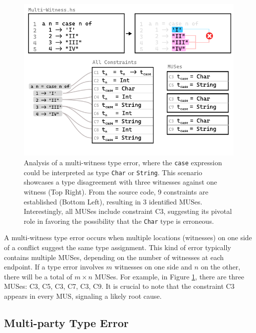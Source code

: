 \begin{figure}[hbt]
  \includegraphics[width=\linewidth]{Multi-Witness-MUS}
  \caption{\label{fig:multi-witness-2}
  Analysis of a multi-witness type error, where the \texttt{case} expression could be interpreted as type \texttt{Char} or \texttt{String}. This scenario showcases a type disagreement with three witnesses against one witness (Top Right). From the source code, 9 constraints are established (Bottom Left), resulting in 3 identified MUSes. Interestingly, all MUSes include constraint C3, suggesting its pivotal role in favoring the possibility that the \texttt{Char} type is erroneous.}
  \end{figure}

A multi-witness type error occurs when multiple locations (witnesses) on one side of a conflict suggest the same type assignment. This kind of error typically contains multiple MUSes, depending on the number of witnesses at each endpoint. If a type error involves $m$ witnesses on one side and $n$ on the other, there will be a total of $m \times n$ MUSes. For example, in Figure \ref{fig:multi-witness-2}, there are three MUSes: {C3, C5}, {C3, C7}, {C3, C9}. It is crucial to note that the constraint C3 appears in every MUS, signaling a likely root cause.

\subsection{Multi-party Type Error}

